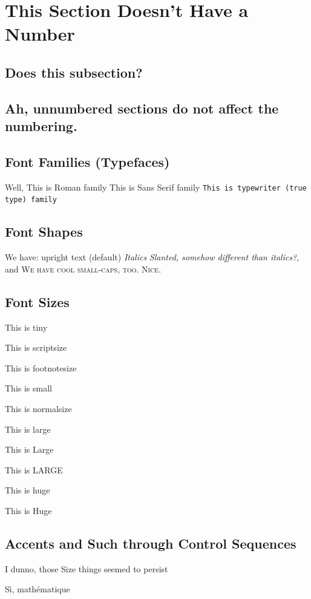 \documentclass[a4paper,12pt,titlepage]{article}
\begin{document}
\section*{This Section Doesn't Have a Number}
\subsection*{Does this subsection?}
\subsection{Ah, unnumbered sections do not affect the numbering.}

\subsection*{Font Families (Typefaces)}
Well, \textrm{This is Roman family}
\textsf{This is Sans Serif family}
\texttt{This is typewriter (true type) family}

\subsection*{Font Shapes}
We have:  \textup{upright text (default)}
\textit{ Italics }
\textsl{Slanted, somehow different than italics?}, and
\textsc{We have cool small-caps, too.  Nice.}

\subsection*{Font Sizes}
\tiny{This is tiny}

\scriptsize{This is scriptsize}

\footnotesize{This is footnotesize}

\small{This is small}

\normalsize{This is normalsize}

\large{This is large}

\Large{This is Large}

\LARGE{This is LARGE}

\huge{This is huge}

\Huge{This is Huge}


\subsection*{Accents and Such through Control Sequences}
\normalsize{I dunno, those Size things seemed to persist}

S\'{\i}, math\'ematique
\end{document}
